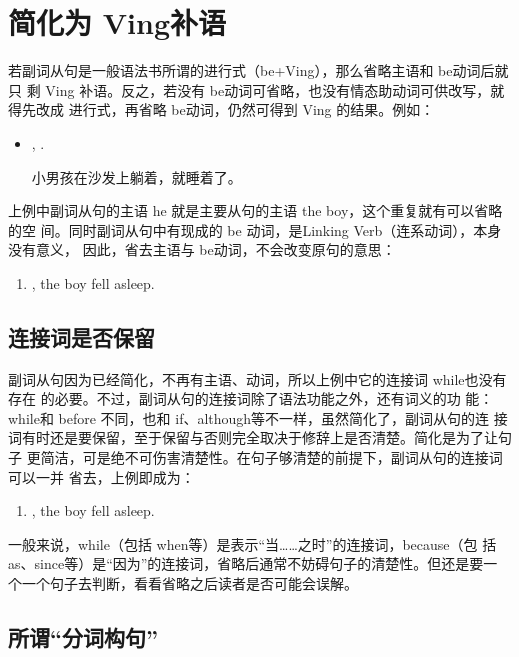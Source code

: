 \section{简化为 Ving补语}

若副词从句是一般语法书所谓的进行式（be+Ving），那么省略主语和 be动词后就只
剩 Ving 补语。反之，若没有 be动词可省略，也没有情态助动词可供改写，就得先改成
进行式，再省略 be动词，仍然可得到 Ving 的结果。例如：

\begin{itemize}
\item {},   .

  小男孩在沙发上躺着，就睡着了。
\end{itemize}
上例中副词从句的主语 he 就是主要从句的主语 the boy，这个重复就有可以省略的空
间。同时副词从句中有现成的 be 动词，是Linking Verb（连系动词），本身没有意义，
因此，省去主语与 be动词，不会改变原句的意思：
\begin{enumerate}
\item {}, the boy fell asleep.
\end{enumerate}

\subsection{连接词是否保留}

副词从句因为已经简化，不再有主语、动词，所以上例中它的连接词 while也没有存在
的必要。不过，副词从句的连接词除了语法功能之外，还有词义的功
能：while和 before 不同，也和 if、although等不一样，虽然简化了，副词从句的连
接词有时还是要保留，至于保留与否则完全取决于修辞上是否清楚。简化是为了让句子
更简洁，可是绝不可伤害清楚性。在句子够清楚的前提下，副词从句的连接词可以一并
省去，上例即成为：
\begin{enumerate}[resume]
\item {}, the boy fell asleep.
\end{enumerate}

一般来说，while（包括 when等）是表示“当……之时”的连接词，because（包
括 as、since等）是“因为”的连接词，省略后通常不妨碍句子的清楚性。但还是要一
个一个句子去判断，看看省略之后读者是否可能会误解。

\subsection{所谓“分词构句”}

